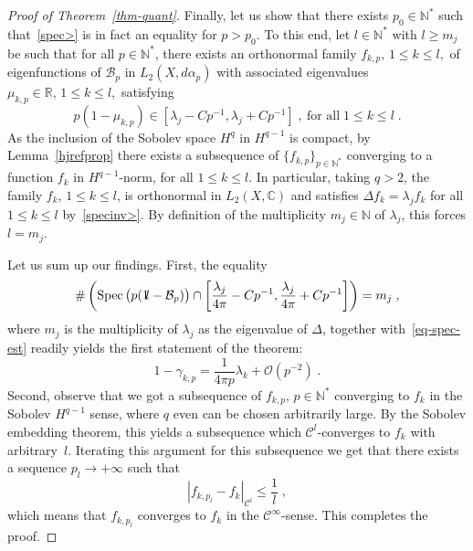 \documentclass[11pt]{article}
\theoremstyle{definition}
\numberwithin{equation}{section}
\numberwithin{figure}{section}
\numberwithin{table}{section}
\DeclareMathOperator{\Spec}{Spec}
\newcommand{\R}{{\mathbb{R}}}
\newcommand{\N}{{\mathbb{N}}}
\newcommand{\CCC}{{\mathbb{C}}}
\newcommand{\cB}{{\mathcal{B}}}
\newcommand*\id{{1\hskip-2.5pt{\rm l}}}
\newcommand{\bigo}{\mathcal{O}}
\renewcommand\leq {\leqslant}
\renewcommand\geq {\geqslant}
\newcommand\< {\mathcal{h}}
\renewcommand\> {\mathcal{i}}
\newcommand*\cC{\mathscr{C}}
\begin{document}
\begin{proof}[Proof of Theorem~\ref{thm-quant}]
Finally, let us show that there exists $p_0\in\N^*$ such that~\eqref{spec>} is in fact an equality for $p>p_0$. To this end, let $l\in\N^*$ with $l\geq m_j$ be such that for all $p\in\N^*$, there exists an orthonormal family $f_{k,p},\,1\leq k\leq l,$ of eigenfunctions of $\cB_p$ in $L_2(X,d\alpha_p)$ with associated eigenvalues $\mu_{k,p}\in\R,\,1\leq k\leq l,$ satisfying
\begin{equation}
p(1-\mu_{k,p})\in\left[\lambda_j-Cp^{-1},\lambda_j+Cp^{-1}\right]\;,\:
\text{for all}\;1\leq k\leq l\;.
\end{equation}
As the inclusion of the Sobolev space $H^q$ in $H^{q-1}$ is compact, by Lemma~\ref{hjrefprop} there exists a subsequence of $\{f_{k,p}\}_{p\in\N^*}$ converging to a function $f_k$ in $H^{q-1}$-norm, for all $1\leq k\leq l$. In particular, taking $q>2$, the family $f_k,\,1\leq k\leq l$, is orthonormal in $L_2(X,\CCC)$ and satisfies $\Delta f_k=\lambda_j f_k$ for all $1\leq k\leq l$ by~\eqref{specinv>}. By definition of the multiplicity $m_j\in\N$ of $\lambda_j$, this forces $l=m_j$.

Let us sum up our findings. First, the equality
\[
\#\left(\Spec\big(p(\id-\cB_p)\big)\cap\left[\frac{\lambda_j}{4\pi}-Cp^{-1},\frac{\lambda_j}{4\pi}+Cp^{-1}\right]\right) = m_j\;,
\]
where $m_j$ is the multiplicity of $\lambda_j$ as the eigenvalue of $\Delta$, together with~\eqref{eq-spec-est} readily yields the first statement of the theorem:
\[
1-\gamma_{k,p} =\frac{1}{4\pi p}\lambda_k + \bigo\left(p^{-2}\right)\;.
\]
Second, observe that we got a subsequence of $f_{k,p}$, $p \in \N^*$ converging to $f_k$ in the Sobolev $H^{q-1}$ sense, where $q$ even can be chosen arbitrarily large. By the Sobolev embedding theorem, this yields a subsequence which $\cC^l$-converges to $f_k$ with arbitrary~$l$. Iterating this argument for this subsequence we get that there exists a sequence $p_l \to +\infty$ such that
\[
|f_{k,p_l} - f_k|_{\cC^l} \leq \frac{1}{l}\;,
\]
which means that $f_{k,p_l}$ converges to $f_k$ in the $\cC^\infty$-sense. This completes the proof.
\end{proof}
%
\end{document}
